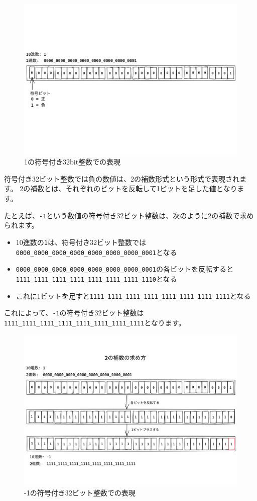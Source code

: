\begin{figure}[h]
\centering
\includegraphics[width=130mm]{fig/0001.pdf}
\caption{1の符号付き32bit整数での表現}
\end{figure}

符号付き32ビット整数では負の数値は、2の補数形式という形式で表現されます。
2の補数とは、それぞれのビットを反転して1ビットを足した値となります。

たとえば、\texttt{-1}という数値の符号付き32ビット整数は、次のように2の補数で求められます。

\begin{itemize}
\item 10進数の\texttt{1}は、符号付き32ビット整数では\texttt{0000\_0000\_0000\_0000\_0000\_0000\_0000\_0001}となる
\item \texttt{0000\_0000\_0000\_0000\_0000\_0000\_0000\_0001}の各ビットを反転すると\texttt{1111\_1111\_1111\_1111\_1111\_1111\_1111\_1110}となる
\item これに1ビットを足すと\texttt{1111\_1111\_1111\_1111\_1111\_1111\_1111\_1111}となる
\end{itemize}

これによって、\texttt{-1}の符号付き32ビット整数は\texttt{1111\_1111\_1111\_1111\_1111\_1111\_1111\_1111}となります。

\begin{figure}[h]
\centering
\includegraphics[width=130mm]{fig/1111.pdf}
\caption{-1の符号付き32ビット整数での表現}
\end{figure}

